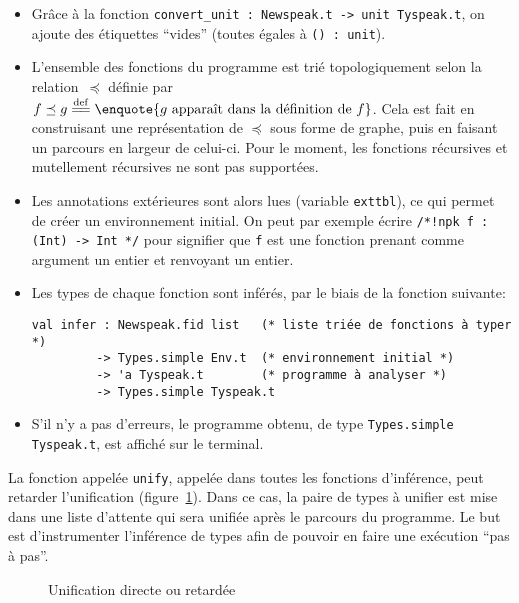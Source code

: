 \begin{itemize}

\item Grâce à la fonction \verb!convert_unit : Newspeak.t -> unit Tyspeak.t!, on
ajoute des étiquettes \enquote{vides} (toutes égales à \verb!() : unit!).

\item L'ensemble des fonctions du programme est trié topologiquement selon la
    relation~$\preceq$ définie par $f \preceq g \eqdef \enquote{g \textrm{
    apparaît dans la définition de } f}$. Cela est fait en construisant une
    représentation de $\preceq$ sous forme de graphe, puis en faisant un
    parcours en largeur de celui-ci. Pour le moment, les fonctions récursives et
    mutellement récursives ne sont pas supportées.

\item Les annotations extérieures sont alors lues (variable \texttt{exttbl}), ce
  qui permet de créer un environnement initial. On peut par exemple écrire
  \texttt{/*!npk f : (Int) -> Int */} pour signifier que \texttt{f} est une
  fonction prenant comme argument un entier et renvoyant un entier.


\item Les types de chaque fonction sont inférés, par le biais de la fonction
  suivante:

\begin{Verbatim}
val infer : Newspeak.fid list   (* liste triée de fonctions à typer *)
         -> Types.simple Env.t  (* environnement initial *)
         -> 'a Tyspeak.t        (* programme à analyser *)
         -> Types.simple Tyspeak.t
\end{Verbatim}

\item S'il n'y a pas d'erreurs, le programme obtenu, de type
\texttt{Types.simple Tyspeak.t}, est affiché sur le terminal.

\end{itemize}

La fonction appelée \texttt{unify}, appelée dans toutes les fonctions
d'inférence, peut retarder l'unification (figure~\ref{fig:implem-lazy}). Dans ce
cas, la paire de types à unifier est mise dans une liste d'attente qui sera
unifiée après le parcours du programme. Le but est d'instrumenter l'inférence de
types afin de pouvoir en faire une exécution \enquote{pas à pas}.

\begin{figure}


\caption{Unification directe ou retardée}
\label{fig:implem-lazy}
\end{figure}

